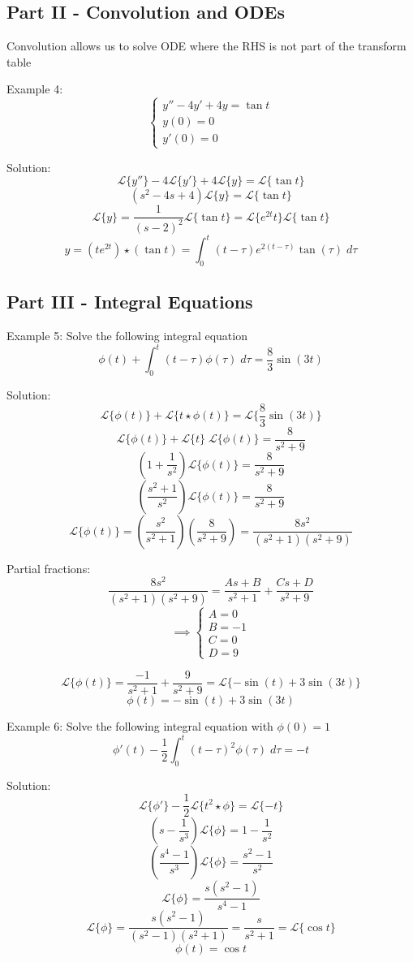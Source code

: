\documentclass[12pt]{article}
\renewcommand{\L}[1]{\mathcal{L}\{#1\}}
\begin{document}
\subsection*{Part II - Convolution and ODEs}
Convolution allows us to solve ODE where the RHS is not part of the transform table

Example 4: 
\[\begin{cases}
    y'' - 4y' + 4y = \tan t\\
    y(0) = 0\\
    y'(0) = 0
\end{cases}\]

Solution:
\[\L{y''} - 4\L{y'} + 4\L{y} = \L{\tan t}\]
\[(s^2 - 4s + 4)\L{y} = \L{\tan t}\]
\[\L{y} = \frac{1}{(s - 2)^2} \L{\tan{t}} = \L{e^{2t}t} \L{\tan t}\]
\[\boxed{y = (te^{2t})\star (\tan t) = \int_0^t (t - \tau)e^{2(t -\tau)} \tan (\tau) \; d\tau}\]

\subsection*{Part III - Integral Equations}
Example 5: Solve the following integral equation
\[\phi(t) + \int_0^t (t- \tau) \phi (\tau) \; d\tau = \frac{8}{3}\sin (3t)\]

Solution:
\[\L{\phi(t)} + \L{t \star \phi(t)} = \L{\frac{8}{3}\sin(3t)}\]
\[\L{\phi(t)} + \L{t} \; \L{\phi(t)} = \frac{8}{s^2 + 9}\]
\[(1 + \frac{1}{s^2}) \L{\phi(t)} = \frac{8}{s^2 + 9}\]
\[\left(\frac{s^2 + 1}{s^2}\right) \L{\phi(t)} = \frac{8}{s^2 + 9}\]
\[\L{\phi(t)} = \left(\frac{s^2}{s^2 + 1}\right)\left(\frac{8}{s^2 +9}\right) = \frac{8s^2}{(s^2+1)(s^2+9)}\]

Partial fractions:
\[\frac{8s^2}{(s^2+1)(s^2+9)} = \frac{As + B}{s^2 + 1} + \frac{Cs + D}{s^2 + 9}\]
\[\implies \begin{cases}
    A = 0\\
    B = -1\\
    C = 0\\
    D = 9
\end{cases}\]

\[\L{\phi(t)} = \frac{-1}{s^2 + 1} + \frac{9}{s^2 + 9} = \L{-\sin(t) + 3\sin(3t)}\]
\[\boxed{\phi(t) = -\sin(t) + 3\sin(3t)}\]

Example 6: Solve the following integral equation with $\phi(0) = 1$
\[\phi'(t) - \frac{1}{2}\int_0^t (t - \tau)^2 \phi(\tau)\;d\tau = -t\]

Solution:
\[\L{\phi'} - \frac{1}{2}\L{t^2 \star \phi} = \L{-t}\]
\[\left(s - \frac{1}{s^3}\right)\L{\phi} = 1 - \frac{1}{s^2}\]
\[\left(\frac{s^4 - 1}{s^3}\right) \L{\phi} = \frac{s^2-1}{s^2}\]
\[\L{\phi} = \frac{s(s^2 - 1)}{s^4 - 1}\]
\[\L{\phi} = \frac{s(s^2 - 1)}{(s^2 - 1)(s^2 + 1)} = \frac{s}{s^2 + 1} = \L{\cos t}\]
\[\boxed{\phi(t) = \cos t}\]
\end{document}
